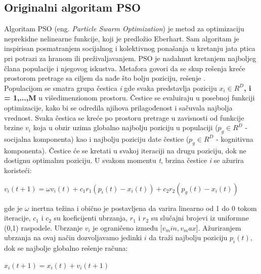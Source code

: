 \documentclass[a4paper]{article}
\begin{document}
{\subsection{Originalni algoritam PSO}
\label{subsec:opso}
Algoritam PSO (eng. \textit{Particle Swarm Optimization}) je metod za optimizaciju neprekidne nelinearne funkcije, koji je predložio Eberhart.
Sam algoritam je inspirisan posmatranjem socijalnog i kolektivnog ponašanja u kretanju jata ptica pri potrazi za hranom ili preživaljavanjem.
PSO je nadahnut kretanjem najboljeg člana populacije i njegovog iskustva. Metafora govori da se skup rešenja kreće prostorom pretrage sa ciljem da nađe što bolju poziciju, rešenje \cite{hindawi}.
\\
Populacijom se smatra grupa čestica \textit{i} gde svaka predstavlja poziciju \textbf{\textbf{$x_i \in R^D$, i = 1,...,M}} u višedimenzionom prostoru.
Čestice se evaluiraju u posebnoj funkciji optimizacije, kako bi se odredila njihova prilagođenost i sačuvala najbolja vrednost. Svaka čestica se kreće po
prostoru pretrage u zavisnosti od funkcije brzine \textbf{$v_i$} koja u obzir uzima globalno najbolju poziciju u populaciji ($p_g \in R^D$ - socijalna
komponenta) kao i najbolju poziciju date čestice ($p_g \in R^D$ - kognitivna komponenta). Čestice će se kretati u svakoj iteraciji na drugu poziciju,
dok ne dostignu optimalnu poziciju. U svakom momentu \textit{t}, brzina čestice \textit{i} se ažurira koristeći: 
\begin{center}
\textbf\textit{$v_i(t+1) = \omega v_i(t) + c_1 r_1(p_i (t) - x_i (t)) + c_2 r_2 (p_g (t) - x_i (t))$}
\end{center}
gde je $\omega$ inertna težina i obično je postavljena da varira linearno od 1 do 0 tokom iteracije, $c_1$ i $c_2$ su koeficijenti ubrzanja, $r_1$ i $r_2$
su slučajni brojevi iz uniformne (0,1) raspodele. Ubrzanje \textbf{$v_i$} je ograničeno između [$v_min, v_max$]. Ažuriranjem ubrzanja na ovaj 
način dozvoljavamo jedinki $i$ da traži najbolju poziciju \textbf{$p_i(t)$}, dok se najbolje globalno rešenje računa:\cite{hindawi}
\begin{center}
\textbf\textit{$x_i(t+1) = x_i(t) + v_i(t+1)$}
\end{center} 



}
\end{document}
